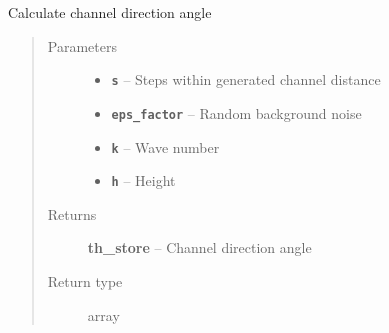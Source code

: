 \documentclass[letterpaper,10pt,english]{sphinxmanual}
\begin{document}

\begin{fulllineitems}
\label{hyvr:hyvr.hyvr.sim.ferguson_theta}
Calculate channel direction angle
\begin{quote}\begin{description}
\item[{Parameters}] \leavevmode\begin{itemize}
\item {} 
\textbf{\texttt{s}} -- Steps within generated channel distance

\item {} 
\textbf{\texttt{eps\_factor}} -- Random background noise

\item {} 
\textbf{\texttt{k}} -- Wave number

\item {} 
\textbf{\texttt{h}} -- Height

\end{itemize}

\item[{Returns}] \leavevmode
\textbf{th\_store} -- Channel direction angle

\item[{Return type}] \leavevmode
array

\end{description}\end{quote}

\end{fulllineitems}

\end{document}
